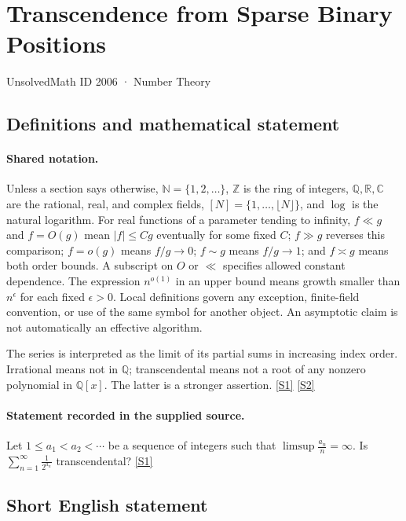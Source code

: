 \documentclass[11pt,a4paper]{article}
\newcommand{\N}{\mathbb{N}}
\newcommand{\Z}{\mathbb{Z}}
\newcommand{\Q}{\mathbb{Q}}
\newcommand{\R}{\mathbb{R}}
\newcommand{\C}{\mathbb{C}}
\newcommand{\sref}[2]{\hyperlink{source:#1:#2}{[S#2]}}
\begin{document}

\setcounter{section}{2005}

\section{Transcendence from Sparse Binary Positions}\label{2006}

{\small\sffamily UnsolvedMath ID 2006 · Number Theory}

\subsection{Definitions and mathematical statement}

\paragraph{Shared notation.}Unless a section says otherwise, $\N=\{1,2,\ldots\}$,
$\Z$ is the ring of integers, $\Q,\R,\C$ are the rational, real, and complex
fields, $[N]=\{1,\ldots,\lfloor N\rfloor\}$, and $\log$ is the natural
logarithm. For real functions of a parameter tending to infinity,
$f\ll g$ and $f=O(g)$ mean $|f|\leq Cg$ eventually for some fixed $C$;
$f\gg g$ reverses this comparison; $f=o(g)$ means $f/g\to0$;
$f\sim g$ means $f/g\to1$; and $f\asymp g$ means both order bounds.
A subscript on $O$ or $\ll$ specifies allowed constant dependence.
The expression $n^{o(1)}$ in an upper bound means growth smaller than
$n^\epsilon$ for each fixed $\epsilon>0$. Local definitions govern any
exception, finite-field convention, or use of the same symbol for another
object. An asymptotic claim is not automatically an effective algorithm.



The series is interpreted as the limit of its partial sums in increasing index order. Irrational means not in $\Q$; transcendental means not a root of any nonzero polynomial in $\Q[x]$. The latter is a stronger assertion. \sref{2006}{1} \sref{2006}{2}

\paragraph{Statement recorded in the supplied source.}
Let $1\leq a_1<a_2<\cdots$ be a sequence of integers such that $ \limsup \frac{a_n}{n}=\infty. $ Is $ \sum_{n=1}^\infty \frac{1}{2^{a_n}} $ transcendental? \sref{2006}{1}

\subsection{Short English statement}
\end{document}
